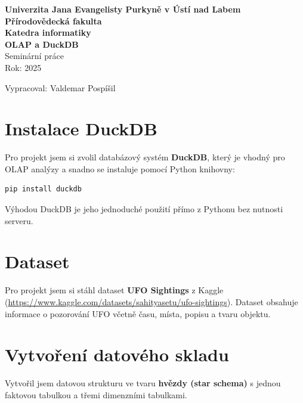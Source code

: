 \documentclass[a4paper,12pt]{article}
\begin{document}
\begin{titlepage}
    \centering
    \vspace*{2cm}
    
    {\LARGE \textbf{Univerzita Jana Evangelisty Purkyně v Ústí nad Labem}}\\[0.5cm]
    {\Large \textbf{Přírodovědecká fakulta}}\\[0.5cm]
    {\Large \textbf{Katedra informatiky}}\\[3cm]

    {\Huge \textbf{OLAP a DuckDB}}\\[2cm]

    {\Large Seminární práce}\\[0.5cm]
    {\Large Rok: 2025}\\[3cm]

    \begin{flushright}
        {\Large Vypracoval: Valdemar Pospíšil}\\
    \end{flushright}
\end{titlepage}
\newpage

\tableofcontents
\newpage

\section{Instalace DuckDB}
Pro projekt jsem si zvolil databázový systém \textbf{DuckDB}, který je vhodný pro OLAP analýzy a snadno se instaluje pomocí Python knihovny:

\begin{verbatim}
pip install duckdb
\end{verbatim}

Výhodou DuckDB je jeho jednoduché použití přímo z Pythonu bez nutnosti serveru.

\section{Dataset}
Pro projekt jsem si stáhl dataset \textbf{UFO Sightings} z Kaggle (\url{https://www.kaggle.com/datasets/sahityasetu/ufo-sightings}). Dataset obsahuje informace o pozorování UFO včetně času, místa, popisu a tvaru objektu.

\section{Vytvoření datového skladu}
Vytvořil jsem datovou strukturu ve tvaru \textbf{hvězdy (star schema)} s jednou faktovou tabulkou a třemi dimenzními tabulkami.
\end{document}

